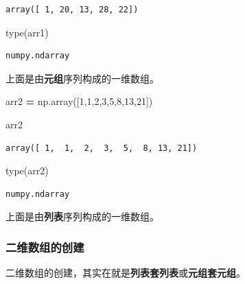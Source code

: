 \documentclass[]{article}
\newenvironment{Shaded}{\begin{snugshade}}{\end{snugshade}}
\newcommand{\DecValTok}[1]{\textcolor[rgb]{0.00,0.00,0.81}{#1}}
\newcommand{\OperatorTok}[1]{\textcolor[rgb]{0.81,0.36,0.00}{\textbf{#1}}}
\newcommand{\BuiltInTok}[1]{#1}
\newcommand{\NormalTok}[1]{#1}
\begin{document}
\begin{verbatim}
array([ 1, 20, 13, 28, 22])
\end{verbatim}

\begin{Shaded}
\begin{Highlighting}[]
\BuiltInTok{type}\NormalTok{(arr1)}
\end{Highlighting}
\end{Shaded}

\begin{verbatim}
numpy.ndarray
\end{verbatim}

上面是由\textbf{元组}序列构成的一维数组。

\begin{Shaded}
\begin{Highlighting}[]
\NormalTok{arr2 }\OperatorTok{=}\NormalTok{ np.array([}\DecValTok{1}\NormalTok{,}\DecValTok{1}\NormalTok{,}\DecValTok{2}\NormalTok{,}\DecValTok{3}\NormalTok{,}\DecValTok{5}\NormalTok{,}\DecValTok{8}\NormalTok{,}\DecValTok{13}\NormalTok{,}\DecValTok{21}\NormalTok{])}
\end{Highlighting}
\end{Shaded}

\begin{Shaded}
\begin{Highlighting}[]
\NormalTok{arr2}
\end{Highlighting}
\end{Shaded}

\begin{verbatim}
array([ 1,  1,  2,  3,  5,  8, 13, 21])
\end{verbatim}

\begin{Shaded}
\begin{Highlighting}[]
\BuiltInTok{type}\NormalTok{(arr2)}
\end{Highlighting}
\end{Shaded}

\begin{verbatim}
numpy.ndarray
\end{verbatim}

上面是由\textbf{列表}序列构成的一维数组。

\subsubsection{二维数组的创建}

二维数组的创建，其实在就是\textbf{列表套列表}或\textbf{元组套元组}。
\end{document}

